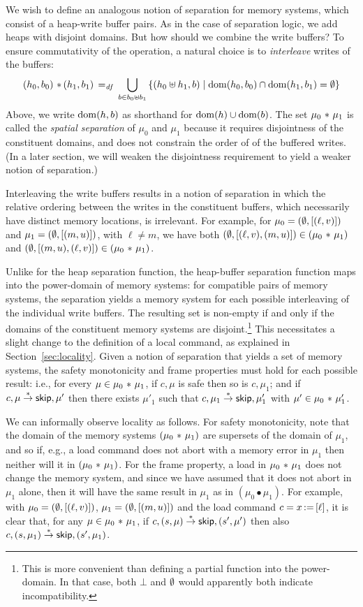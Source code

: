 \documentclass[11pt]{report}
\begin{document}
We wish to define an analogous notion of separation for memory systems, which consist of a heap-write buffer pairs. As in the case of separation logic, we add heaps with disjoint domains. But how should we combine the write buffers? To ensure commutativity of the operation, a natural choice is to \emph{interleave} writes of the buffers: \[ (h_0,b_0) \operatorname{\,\ast\,} (h_1,b_1) \operatorname{\;=_{\mathit{df}}\;} \bigcup_{b \in b_0 \uplus b_1}
    \left\lbrace (h_0 \uplus h_1, b) \mid \operatorname{\mathrm{dom}}(h_0,b_0) \cap \operatorname{\mathrm{dom}}(h_1,b_1) = \operatorname{\emptyset} \right\rbrace
\] Above, we write $\operatorname{\mathrm{dom}}(h,b)$ as shorthand for $\operatorname{\mathrm{dom}}(h) \cup \operatorname{\mathrm{dom}}(b)$. The set $\mu_0 \operatorname{\,\ast\,} \mu_1$ is called the \emph{spatial separation} of $\mu_0$ and $\mu_1$ because it requires disjointness of the constituent domains, and does not constrain the order of of the buffered writes. (In a later section, we will weaken the disjointness requirement to yield a weaker notion of separation.)

Interleaving the write buffers results in a notion of separation in which the relative ordering between the writes in the constituent buffers, which necessarily have distinct memory locations, is irrelevant. For example, for $\mu_0 = (\operatorname{\emptyset},\left[(\ell,v)\right])$ and $\mu_1 = (\operatorname{\emptyset},\left[(m,u)\right])$, with $\ell \neq m$, we have both $(\operatorname{\emptyset},\left[(\ell,v),(m,u)\right]) \in (\mu_0 \operatorname{\,\ast\,} \mu_1)$ and $(\operatorname{\emptyset},\left[(m,u),(\ell,v)\right]) \in (\mu_0 \operatorname{\,\ast\,} \mu_1)$. 

Unlike for the heap separation function, the heap-buffer separation function maps into the power-domain of memory systems: for compatible pairs of memory systems, the separation yields a memory system for each possible interleaving of the individual write buffers. The resulting set is non-empty if and only if the domains of the constituent memory systems are disjoint.\footnote{This is more convenient than defining a partial function into the power-domain. In that case, both $\bot$ and $\operatorname{\emptyset}$ would apparently both indicate incompatibility.} This necessitates a slight change to the definition of a local command, as explained in Section~\ref{sec:locality}. Given a notion of separation that yields a set of memory systems, the safety monotonicity and frame properties must hold for each possible result: i.e., for every $\mu \in \mu_0 \operatorname{\,\ast\,} \mu_1$, if $c,\mu$ is safe then so is $c,\mu_1$; and if $c,\mu \stackrel{\ast}{\rightarrow} \operatorname{\mathsf{skip}},\mu'$ then there exists $\mu'_1$ such that $c,\mu_1 \stackrel{\ast}{\rightarrow} \operatorname{\mathsf{skip}},\mu'_1$ with $\mu' \in \mu_0 \operatorname{\,\ast\,} \mu'_1$. 

We can informally observe locality as follows. For safety monotonicity, note that the domain of the memory systems $(\mu_0 \operatorname{\,\ast\,} \mu_1)$ are supersets of the domain of $\mu_1$, and so if, e.g., a load command does not abort with a memory error in $\mu_1$ then neither will it in $(\mu_0 \operatorname{\,\ast\,} \mu_1)$. For the frame property, a load in $\mu_0 \operatorname{\,\ast\,} \mu_1$ does not change the memory system, and since we have assumed that it does not abort in $\mu_1$ alone, then it will have the same result in $\mu_1$ as in $(\mu_0 \bullet \mu_1)$. For example, with $\mu_0 = (\operatorname{\emptyset},\left[(\ell,v)\right])$, $\mu_1 = (\operatorname{\emptyset},\left[(m,u)\right])$ and the load command $c = x \operatorname{:\!=} \left[ \ell \right]$, it is clear that, for any $\mu \in \mu_0 \operatorname{\,\ast\,} \mu_1$, if $c,(s,\mu) \stackrel{\ast}{\rightarrow} \operatorname{\mathsf{skip}},(s',\mu')$ then also $c,(s,\mu_1) \stackrel{\ast}{\rightarrow} \operatorname{\mathsf{skip}},(s',\mu_1)$.
\end{document}
